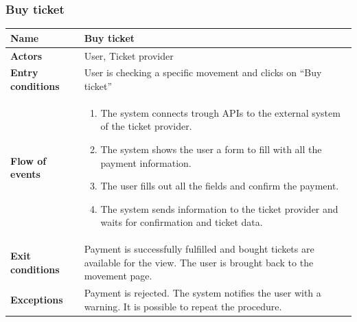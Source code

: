 \subsubsection{Buy ticket}
\begin{table}[!h]
	\centering
	{\renewcommand{\arraystretch}{2}%
		\begin{tabular}{|l|p{12cm}|}
			\hline
			\textbf{Name} 				& \textbf{Buy ticket} \\ \hline
			\textbf{Actors} 			& User, Ticket provider \\ \hline
			\textbf{Entry conditions} 	& User is checking a specific movement and clicks on “Buy ticket” \\ \hline
			\textbf{Flow of events}		& \begin{minipage}[t]{0.75\textwidth}
				\begin{enumerate}
					\item The system connects trough APIs to the external system of the ticket provider.
					\item The system shows the user a form to fill with all the payment information.
					\item The user fills out all the fields and confirm the payment.
					\item The system sends information to the ticket provider and waits for confirmation and ticket data.
				\end{enumerate}
			\end{minipage}	\\ \hline
			\textbf{Exit conditions}	& Payment is successfully fulfilled and bought tickets are available for the view. The user is brought back to the movement page.  \\ \hline
			\textbf{Exceptions}			& Payment is rejected. The system notifies the user with a warning. It is possible to repeat the procedure. \\ \hline
	\end{tabular}}
\end{table}
\clearpage

